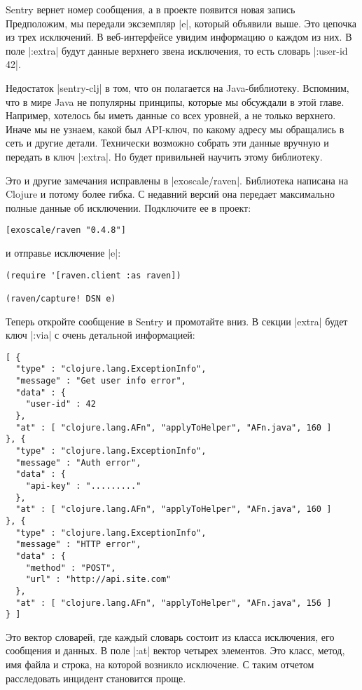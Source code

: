 Sentry вернет номер сообщения, а в проекте появится новая запись Предположим, мы
передали эксземпляр \spverb|e|, который объявили выше. Это цепочка из трех
исключений. В веб-интерфейсе увидим информацию о каждом из них. В поле \spverb|:extra|
будут данные верхнего звена исключения, то есть словарь \spverb|{:user-id 42}|.

Недостаток \spverb|sentry-clj| в том, что он полагается на Java-библиотеку. Вспомним,
что в мире Java не популярны принципы, которые мы обсуждали в этой
главе. Например, хотелось бы иметь данные со всех уровней, а не только
верхнего. Иначе мы не узнаем, какой был API-ключ, по какому адресу мы обращались
в сеть и другие детали. Технически возможно собрать эти данные вручную и
передать в ключ \spverb|:extra|. Но будет привильней научить этому библиотеку.

Это и другие замечания исправлены в \spverb|exoscale/raven|. Библиотека написана на
Clojure и потому более гибка. С недавний версий она передает максимально полные
данные об исключении. Подключите ее в проект:

\begin{verbatim}
[exoscale/raven "0.4.8"]
\end{verbatim}

и отправье исключение \spverb|e|:

\begin{verbatim}
(require '[raven.client :as raven])

(raven/capture! DSN e)
\end{verbatim}

Теперь откройте сообщение в Sentry и промотайте вниз. В секции \spverb|extra| будет
ключ \spverb|:via| с очень детальной информацией:

\begin{verbatim}
[ {
  "type" : "clojure.lang.ExceptionInfo",
  "message" : "Get user info error",
  "data" : {
    "user-id" : 42
  },
  "at" : [ "clojure.lang.AFn", "applyToHelper", "AFn.java", 160 ]
}, {
  "type" : "clojure.lang.ExceptionInfo",
  "message" : "Auth error",
  "data" : {
    "api-key" : "........."
  },
  "at" : [ "clojure.lang.AFn", "applyToHelper", "AFn.java", 160 ]
}, {
  "type" : "clojure.lang.ExceptionInfo",
  "message" : "HTTP error",
  "data" : {
    "method" : "POST",
    "url" : "http://api.site.com"
  },
  "at" : [ "clojure.lang.AFn", "applyToHelper", "AFn.java", 156 ]
} ]
\end{verbatim}

Это вектор словарей, где каждый словарь состоит из класса исключения, его
сообщения и данных. В поле \spverb|:at| вектор четырех элементов. Это класс, метод, имя
файла и строка, на которой возникло исключение. С таким отчетом расследовать
инцидент становится проще.

